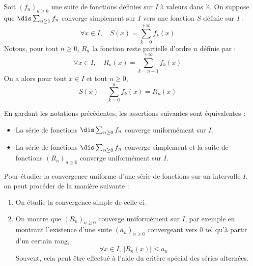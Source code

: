 \documentclass[a4paper,10pt]{report}
\begin{document}
\medskip

\noindent Soit $(f_n)_{n \geq 0}$ une suite de fonctions définies sur $I$ à valeurs dans $\mathbb{K}$. On suppose que $\dis \sum_{n \geq 1} f_n$ converge simplement sur $I$ vers une fonction $S$ définie sur $I$ :
$$ \forall x \in I, \quad S(x) = \sum_{k=0}^{+ \infty} f_k(x)$$
Notons, pour tout $n \geq 0$, $R_n$ la fonction reste partielle d'ordre $n$ définie par :
$$ \forall x \in I, \quad R_n(x) = \sum_{k=n+1}^{+ \infty} f_k(x)$$
On a alors pour tout $x \in I$ et tout $n \geq 0$,
$$ S(x) - \sum_{k=0}^n f_k(x) = R_n(x)$$

\begin{prop}\label{CritCVU} En gardant les notations précédentes, les assertions suivantes sont équivalentes :

\begin{itemize}
\item La série de fonctions $\dis \sum_{n \geq 0} f_n$ converge uniformément sur $I$.
\item La série de fonctions $\dis \sum_{n \geq 0} f_n$ converge simplement et la suite de fonctions $(R_n)_{n \geq 0}$ converge uniformément sur $I$.
\end{itemize}
\end{prop}

\begin{metho} Pour étudier la convergence uniforme d'une série de fonctions sur un intervalle $I$, on peut procéder de la manière suivante :
\begin{enumerate}
\item On étudie la convergence simple de celle-ci.
\item On montre que $(R_n)_{n \geq 0}$ converge uniformément sur $I$, par exemple en montrant l'existence d'une suite $(a_n)_{n \geq 0}$ convergeant vers $0$ tel qu'à partir d'un certain rang,
$$ \forall x \in I, \, \vert R_n(x) \vert \leq a_n $$
Souvent, cela peut être effectué à l'aide du critère spécial des séries alternées.
\end{enumerate}
\end{metho}
\end{document}

